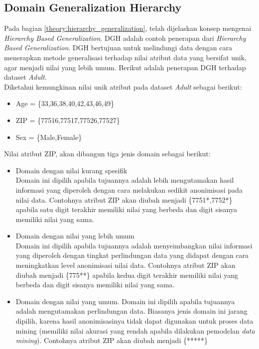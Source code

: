 \subsection{Domain Generalization Hierarchy}
Pada bagian \ref{theory:hierarchy_generalization}, telah dijelaskan konsep mengenai \textit{Hierarchy Based Generalization}. DGH adalah contoh penerapan dari \textit{Hierarchy Based Generalization}. DGH bertujuan untuk melindungi data dengan cara menerapkan metode generalisasi terhadap nilai atribut data yang bersifat unik, agar menjadi nilai yang lebih umum. Berikut adalah penerapan DGH terhadap dataset \textit{Adult}. \\

\noindent Diketahui kemungkinan nilai unik atribut pada dataset \textit{Adult} sebagai berikut:

\begin{itemize}
\item Age = \{33,36,38,40,42,43,46,49\}
\item ZIP = \{77516,77517,77526,77527\}
\item Sex = \{Male,Female\}
\end{itemize}

\noindent Nilai atribut ZIP, akan dibangun tiga jenis domain sebagai berikut:

\begin{itemize}
\item Domain dengan nilai kurang spesifik\\
Domain ini dipilih apabila tujuannya adalah lebih mengutamakan hasil informasi yang diperoleh dengan cara melakukan sedikit anonimisasi pada nilai data. Contohnya atribut ZIP akan diubah menjadi \{7751*,7752*\} apabila satu digit terakhir memiliki nilai yang berbeda dan digit sisanya memiliki nilai yang sama.
\item Domain dengan nilai yang lebih umum\\
Domain ini dipilih apabila tujuannya adalah menyeimbangkan nilai informasi yang diperoleh dengan tingkat perlindungan data yang didapat dengan cara meningkatkan level anonimisasi nilai data. Contohnya atribut ZIP akan diubah menjadi \{775**\} apabila kedua digit terakhir memiliki nilai yang berbeda dan digit sisanya memiliki nilai yang sama.
\item Domain dengan nilai yang umum.
Domain ini dipilih apabila tujuannya adalah mengutamakan perlindungan data. Biasanya jenis domain ini jarang dipilih, karena hasil anonimisasinya tidak dapat digunakan untuk proses data mining (memiliki nilai akurasi yang rendah apabila dilakukan pemodelan \textit{data mining}). Contohnya atribut ZIP akan diubah menjadi \{*****\}

\end{itemize}

